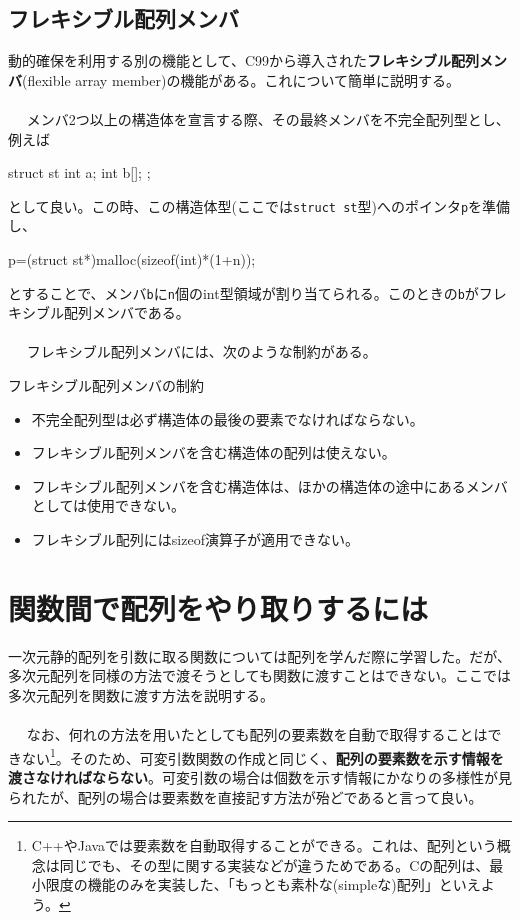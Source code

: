 \subsection{フレキシブル配列メンバ}
動的確保を利用する別の機能として、C99から導入された\textbf{フレキシブル配列メンバ}(flexible array member)の機能がある。これについて簡単に説明する。
\\ \\　
メンバ2つ以上の構造体を宣言する際、その最終メンバを不完全配列型とし、例えば
\begin{code}
struct st{
  int a;
  int b[];
};
\end{code}
として良い。この時、この構造体型(ここでは\verb|struct st|型)へのポインタ\verb|p|を準備し、
\begin{code}
p=(struct st*)malloc(sizeof(int)*(1+n));
\end{code}
とすることで、メンバ\verb|b|に\verb|n|個のint型領域が割り当てられる。このときの\verb|b|がフレキシブル配列メンバである。
\\ \\　
フレキシブル配列メンバには、次のような制約がある。
\begin{itembox}[l]{フレキシブル配列メンバの制約}
\begin{itemize}
\item 不完全配列型は必ず構造体の最後の要素でなければならない。
\item フレキシブル配列メンバを含む構造体の配列は使えない。
\item フレキシブル配列メンバを含む構造体は、ほかの構造体の途中にあるメンバとしては使用できない。
\item フレキシブル配列にはsizeof演算子が適用できない。
\end{itemize}
\end{itembox}

\section{関数間で配列をやり取りするには}%
一次元静的配列を引数に取る関数については配列を学んだ際に学習した。だが、多次元配列を同様の方法で渡そうとしても関数に渡すことはできない。ここでは多次元配列を関数に渡す方法を説明する。
\\ \\　
なお、何れの方法を用いたとしても配列の要素数を自動で取得することはできない\footnote{C++やJavaでは要素数を自動取得することができる。これは、配列という概念は同じでも、その型に関する実装などが違うためである。Cの配列は、最小限度の機能のみを実装した、「もっとも素朴な(simpleな)配列」といえよう。}。そのため、可変引数関数の作成と同じく、\textbf{配列の要素数を示す情報を渡さなければならない}。可変引数の場合は個数を示す情報にかなりの多様性が見られたが、配列の場合は要素数を直接記す方法が殆どであると言って良い。
